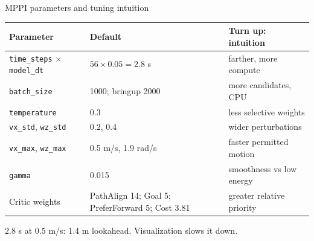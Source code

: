\documentclass[aspectratio=169]{beamer}
\begin{document}
\begin{frame}[t]{MPPI parameters and tuning intuition}
\small
\setlength{\abovedisplayskip}{1mm}\setlength{\belowdisplayskip}{1mm}

\setlength{\abovedisplayskip}{1mm}\setlength{\belowdisplayskip}{1mm}
\setlength{\abovedisplayshortskip}{0pt}\setlength{\belowdisplayshortskip}{0pt}
\renewcommand{\arraystretch}{1.0}\begin{tabularx}{\linewidth}{lXX}
\toprule Parameter & Default & Turn up: intuition\\\midrule
\texttt{time\_steps} $\times$ \texttt{model\_dt} & $56\times0.05=2.8$ s & farther, more compute\\
\texttt{batch\_size} & 1000; bringup 2000 & more candidates, CPU\\
\texttt{temperature} & 0.3 & less selective weights\\
\texttt{vx\_std}, \texttt{wz\_std} & 0.2, 0.4 & wider perturbations\\
\texttt{vx\_max}, \texttt{wz\_max} & 0.5 m/s, 1.9 rad/s & faster permitted motion\\
\texttt{gamma} & 0.015 & smoothness vs low energy\\
Critic weights & PathAlign 14; Goal 5; PreferForward 5; Cost 3.81 & greater relative priority\\\bottomrule\end{tabularx}
\vspace{2mm}\par $2.8$ s at $0.5$ m/s: $1.4$ m lookahead. Visualization slows it down.\par\vspace{1mm}{\scriptsize Defaults in the Nav2 repository; check your release.}

\end{frame}
\end{document}
